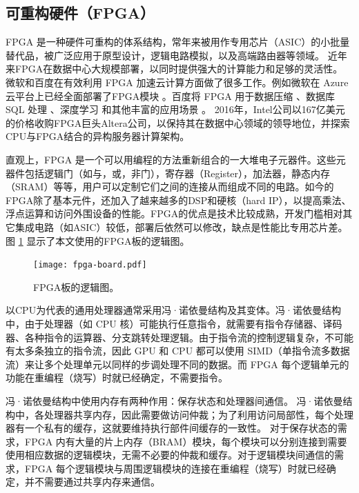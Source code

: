 \subsection{可重构硬件（FPGA）}
\label{smartnic-fpga}

FPGA 是一种硬件可重构的体系结构，常年来被用作专用芯片（ASIC）的小批量替代品，被广泛应用于原型设计，逻辑电路模拟，以及高端路由器等领域。
近年来FPGA在数据中心大规模部署，以同时提供强大的计算能力和足够的灵活性。
微软和百度在有效利用 FPGA 加速云计算方面做了很多工作。例如微软在 Azure 云平台上已经全面部署了FPGA模块 \cite{putnam2014reconfigurable,caulfield2016cloud}。百度将 FPGA 用于数据压缩 \cite{ouyang2010fpga}、数据库 SQL 处理 \cite{baidu-fpga-sql}、深度学习 \cite{ouyang2014sda} 和其他丰富的应用场景 \cite{ouyang2017xpu}。
2016年，Intel公司以167亿美元的价格收购FPGA巨头Altera公司，以保持其在数据中心领域的领导地位，并探索CPU与FPGA结合的异构服务器计算架构。

直观上，FPGA 是一个可以用编程的方法重新组合的一大堆电子元器件。这些元器件包括逻辑门（如与，或，非门），寄存器（Register），加法器，静态内存（SRAM）等等，用户可以定制它们之间的连接从而组成不同的电路。如今的FPGA除了基本元件，还加入了越来越多的DSP和硬核（hard IP），以提高乘法、浮点运算和访问外围设备的性能。FPGA的优点是技术比较成熟，开发门槛相对其它集成电路（如ASIC）较低，部署后依然可以修改，缺点是性能比专用芯片差。
图 \ref{clicknp:fig:fpga} 显示了本文使用的FPGA板的逻辑图。


\begin{figure}[htbp]
	\centering
	\texttt{[image: fpga-board.pdf]}
	\caption{FPGA板的逻辑图。}
	\label{clicknp:fig:fpga}
\end{figure}



以CPU为代表的通用处理器通常采用冯·诺依曼结构及其变体。冯·诺依曼结构中，由于处理器（如 CPU 核）可能执行任意指令，就需要有指令存储器、译码器、各种指令的运算器、分支跳转处理逻辑。由于指令流的控制逻辑复杂，不可能有太多条独立的指令流，因此 GPU 和 CPU 都可以使用 SIMD（单指令流多数据流）来让多个处理单元以同样的步调处理不同的数据。而 FPGA 每个逻辑单元的功能在重编程（烧写）时就已经确定，不需要指令。

冯·诺依曼结构中使用内存有两种作用：保存状态和处理器间通信。
冯·诺依曼结构中，各处理器共享内存，因此需要做访问仲裁；为了利用访问局部性，每个处理器有一个私有的缓存，这就要维持执行部件间缓存的一致性。
对于保存状态的需求，FPGA 内有大量的片上内存（BRAM）模块，每个模块可以分别连接到需要使用相应数据的逻辑模块，无需不必要的仲裁和缓存。对于逻辑模块间通信的需求，FPGA 每个逻辑模块与周围逻辑模块的连接在重编程（烧写）时就已经确定，并不需要通过共享内存来通信。

